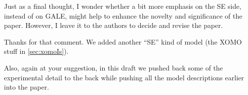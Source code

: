 \documentclass[10pt,journal,compsoc]{IEEEtran}
\newcommand{\tion}[1]{\textsection\ref{sec:#1}}
\newenvironment{changed}{\par\color{MyDarkBlue}}{\par}
\begin{document}
Just as a final thought, I wonder whether a bit more emphasis on the SE side, instead of on GALE, might help to enhance the novelty and significance of the paper. However, I leave it to the authors to decide and revise the paper.

\begin{changed}
Thanks for that comment. We added another ``SE'' kind of model (the XOMO stuff in \tion{xomoIs}).

Also, again at your suggestion, in this draft
we pushed back some of the experimental detail to the back while
pushing all the model descriptions earlier into the paper.
\end{changed}
\end{document}
